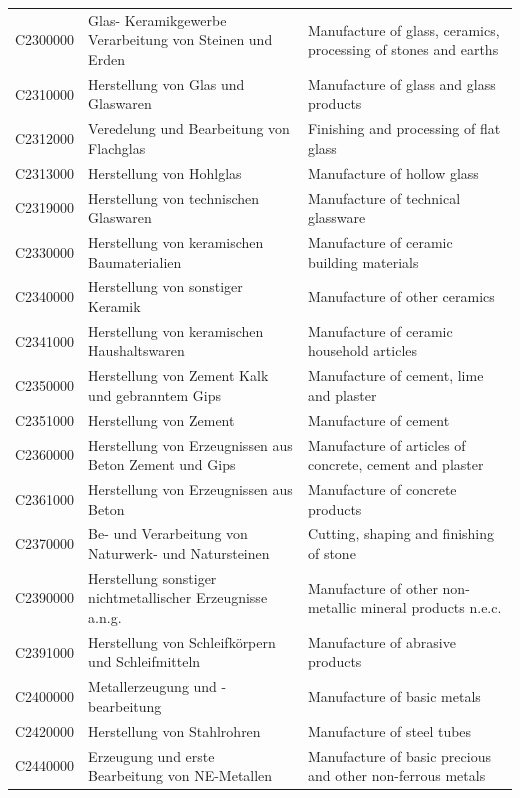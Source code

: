 \begin{longtable}{|p{3cm}|p{6cm}|p{6cm}|}
 C2300000   & Glas- Keramikgewerbe Verarbeitung von Steinen und Erden   & Manufacture of glass, ceramics, processing of stones and earths    \\
 C2310000   & Herstellung von Glas und Glaswaren   & Manufacture of glass and glass products    \\
 C2312000   & Veredelung und Bearbeitung von Flachglas   & Finishing and processing of flat glass    \\
 C2313000   & Herstellung von Hohlglas   & Manufacture of hollow glass    \\
 C2319000   & Herstellung von technischen Glaswaren   & Manufacture of technical glassware    \\
 C2330000   & Herstellung von keramischen Baumaterialien   & Manufacture of ceramic building materials    \\
 C2340000   & Herstellung von sonstiger Keramik    & Manufacture of other ceramics    \\
 C2341000   & Herstellung von keramischen Haushaltswaren   & Manufacture of ceramic household articles    \\
 C2350000   & Herstellung von Zement Kalk und gebranntem Gips   & Manufacture of cement, lime and plaster    \\
 C2351000   & Herstellung von Zement   & Manufacture of cement    \\
 C2360000   & Herstellung von Erzeugnissen aus Beton Zement und Gips   & Manufacture of articles of concrete, cement and plaster    \\
 C2361000   & Herstellung von Erzeugnissen aus Beton   & Manufacture of concrete products    \\
 C2370000   & Be- und Verarbeitung von Naturwerk- und Natursteinen   & Cutting, shaping and finishing of stone    \\
 C2390000   & Herstellung sonstiger nichtmetallischer Erzeugnisse a.n.g.   & Manufacture of other non-metallic mineral products n.e.c.    \\
 C2391000   & Herstellung von Schleifkörpern und Schleifmitteln   & Manufacture of abrasive products    \\
 C2400000   & Metallerzeugung und -bearbeitung   & Manufacture of basic metals    \\
 C2420000   & Herstellung von Stahlrohren   & Manufacture of steel tubes    \\
 C2440000   & Erzeugung und erste Bearbeitung von NE-Metallen   & Manufacture of basic precious and other non-ferrous metals    \\

\end{longtable}
